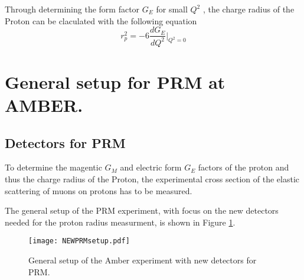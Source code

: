 Through determining the form factor $G_E$ for small $Q^2$ , the charge radius of the Proton can be claculated with the following equation \autocite{intentAmber}
\begin{equation}
\label{eq:charge_radius}
r_p^2 = -6 \frac{dG_E}{dQ^2} \bigg|_{Q^2 = 0}
\end{equation}

\section{General setup for PRM at AMBER.}\label{sec:general_setup}
\subsection{Detectors for PRM}

To determine the magentic $G_M$ and electric form $G_E$ factors of the proton and thus the charge radius of the Proton,
 the experimental cross section of the elastic scattering of muons on protons has to be measured.

The general setup of the PRM experiment, with focus on the new detectors needed for the proton radius measurment, is shown in Figure \ref{fig:amber_setup}.
\begin{figure}[H]
	\centering
	\texttt{[image: NEWPRMsetup.pdf]}
	\caption{General setup of the Amber experiment with new detectors for PRM.
	\autocite{InternalcommunicationKarl}}
	\label{fig:amber_setup}
\end{figure}

